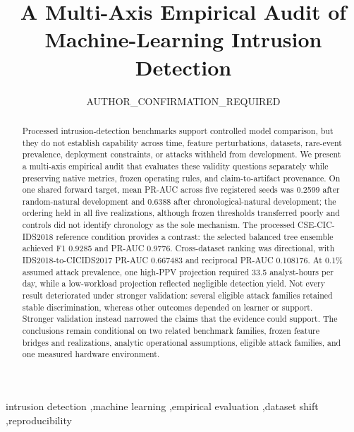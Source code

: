 \documentclass[preprint,12pt]{elsarticle}
\begin{document}
\begin{frontmatter}
\title{A Multi-Axis Empirical Audit of Machine-Learning Intrusion Detection}
\author[anon]{AUTHOR\_CONFIRMATION\_REQUIRED}
\address[anon]{AUTHOR\_CONFIRMATION\_REQUIRED}
\begin{abstract}
Processed intrusion-detection benchmarks support controlled model comparison, but they do not establish capability across time, feature perturbations, datasets, rare-event prevalence, deployment constraints, or attacks withheld from development. We present a multi-axis empirical audit that evaluates these validity questions separately while preserving native metrics, frozen operating rules, and claim-to-artifact provenance. On one shared forward target, mean PR-AUC across five registered seeds was 0.2599 after random-natural development and 0.6388 after chronological-natural development; the ordering held in all five realizations, although frozen thresholds transferred poorly and controls did not identify chronology as the sole mechanism. The processed CSE-CIC-IDS2018 reference condition provides a contrast: the selected balanced tree ensemble achieved F1 0.9285 and PR-AUC 0.9776. Cross-dataset ranking was directional, with IDS2018-to-CICIDS2017 PR-AUC 0.667483 and reciprocal PR-AUC 0.108176. At 0.1\% assumed attack prevalence, one high-PPV projection required 33.5 analyst-hours per day, while a low-workload projection reflected negligible detection yield. Not every result deteriorated under stronger validation: several eligible attack families retained stable discrimination, whereas other outcomes depended on learner or support. Stronger validation instead narrowed the claims that the evidence could support. The conclusions remain conditional on two related benchmark families, frozen feature bridges and realizations, analytic operational assumptions, eligible attack families, and one measured hardware environment.
\end{abstract}
\begin{keyword}
intrusion detection \sep machine learning \sep empirical evaluation \sep dataset shift \sep reproducibility
\end{keyword}
\end{frontmatter}
\end{document}
